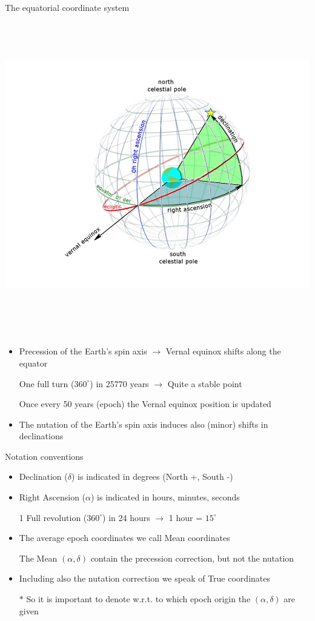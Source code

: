 \Tr
\onecolumn
\begin{center}
{\blue The equatorial coordinate system}\\[3mm]
\includegraphics[keepaspectratio,height=14cm]{ra-dec}
\end{center}

\Tr
\onecolumn
\begin{itemize}
\item Precession of the Earth's spin axis $\rightarrow$ Vernal equinox shifts along the equator
\item[] One full turn ($360^{\circ}$) in 25770 years $\rightarrow$ Quite a stable point
\item[] Once every 50 years (epoch) the Vernal equinox position is updated
\item The nutation of the Earth's spin axis induces also (minor) shifts in declinations
\end{itemize}
%
\begin{center}
{\red Notation conventions}
\end{center}
%
\begin{itemize}
\item {\blue Declination ($\delta$)} is indicated in degrees (North +, South -)
\item {\blue Right Ascension ($\alpha$)} is indicated in hours, minutes, seconds
\item[] 1 Full revolution ($360^{\circ}$) in 24 hours $\rightarrow$ 1 hour = $15^{\circ}$
\item The average epoch coordinates we call {\blue Mean coordinates}
\item[] The Mean $(\alpha,\delta)$ contain the precession correction, but not the nutation
\item Including also the nutation correction we speak of {\blue True coordinates}
\item[$\ast$] So it is important to denote w.r.t. to which epoch origin the $(\alpha,\delta)$ are given
\end{itemize}

